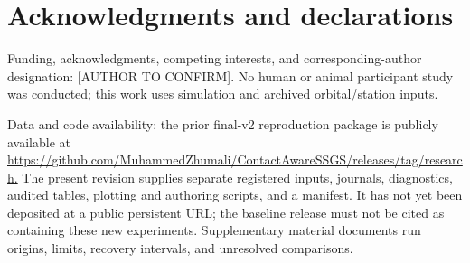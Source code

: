 \documentclass[12pt,a4paper]{article}
\begin{document}
\section*{Acknowledgments and declarations}
Funding, acknowledgments, competing interests, and corresponding-author designation: [AUTHOR TO CONFIRM]. No human or animal participant study was conducted; this work uses simulation and archived orbital/station inputs.

Data and code availability: the prior final-v2 reproduction package is publicly available at \url{https://github.com/MuhammedZhumali/ContactAwareSSGS/releases/tag/research.} The present revision supplies separate registered inputs, journals, diagnostics, audited tables, plotting and authoring scripts, and a manifest. It has not yet been deposited at a public persistent URL; the baseline release must not be cited as containing these new experiments. Supplementary material documents run origins, limits, recovery intervals, and unresolved comparisons.
\end{document}
